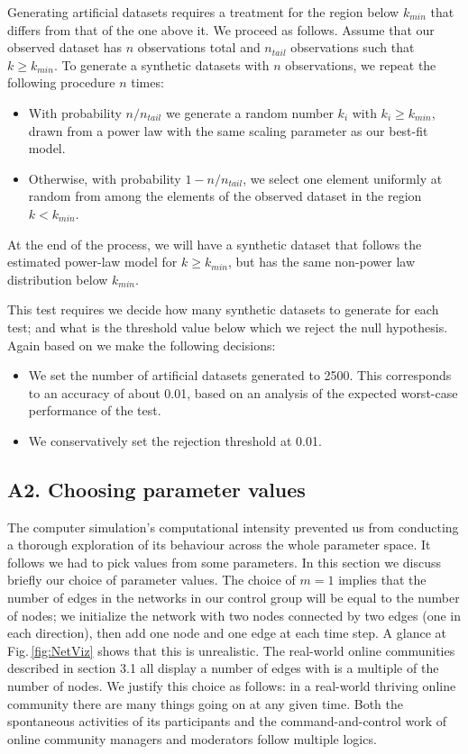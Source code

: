 \documentclass{nws}
\begin{document}
Generating artificial datasets requires a treatment for the region below $k_{min}$  that differs from that of the one above it. We proceed as follows. Assume that our observed dataset has $n$ observations total and $n_{tail}$ observations such that $k \geq k_{min}$. To generate a synthetic datasets with $n$ observations, we repeat the following procedure $n$ times:
\begin{itemize}
\item With probability $n/n_{tail}$ we generate a random number $k_i$ with $k_i \geq k_{min}$, drawn from a power law with the same scaling parameter as our best-fit model.
\item Otherwise, with probability $1 - n/n_{tail}$, we select one element uniformly at random from among the elements of the observed dataset in the region $k<k_{min}$.
\end{itemize}

At the end of the process, we will have a synthetic dataset that follows the estimated power-law model for $k \geq k_{min}$, but has the same non-power law distribution below $k_{min}$.

This test requires we decide how many synthetic datasets to generate for each test; and what is the threshold value below which we reject the null hypothesis. Again based on \cite{clauset2009power} we make the following decisions:

\begin{itemize}
\item We set the number of artificial datasets generated to 2500. This corresponds to an accuracy of about 0.01, based on an analysis of the expected worst-case performance of the test. 
\item We conservatively set the rejection threshold at 0.01.
\end{itemize}


\subsection*{A2. Choosing parameter values}

The computer simulation's computational intensity prevented us from conducting a thorough exploration of its behaviour across the whole parameter space. It follows we had to pick values from some parameters. In this section we discuss briefly our choice of parameter values.
The choice of $m=1$ implies that the number of edges in the networks in our control group will be equal to the number of nodes; we initialize the network with two nodes connected by two edges (one in each direction), then add one node and one edge at each time step. A glance at  Fig.\,\ref{fig:NetViz} shows that this is unrealistic. The real-world online communities described in section 3.1 all display a number of edges with is a multiple of the number of nodes. We justify this choice as follows: in a real-world thriving online community there are many things going on at any given time. Both the spontaneous activities of its participants and the command-and-control work of online community managers and moderators follow multiple logics. 
 
\end{document}
